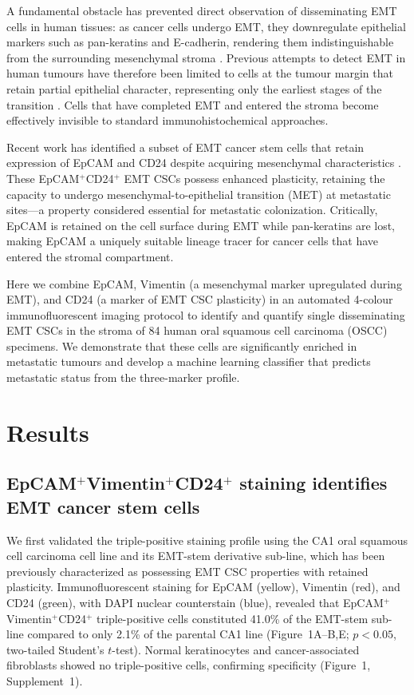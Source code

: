 \documentclass[11pt]{article}
\begin{document}
A fundamental obstacle has prevented direct observation of disseminating EMT cells in human tissues: as cancer cells undergo EMT, they downregulate epithelial markers such as pan-keratins and E-cadherin, rendering them indistinguishable from the surrounding mesenchymal stroma \citep{nieto2016emt}. Previous attempts to detect EMT in human tumours have therefore been limited to cells at the tumour margin that retain partial epithelial character, representing only the earliest stages of the transition \citep{brabletz2001variable}. Cells that have completed EMT and entered the stroma become effectively invisible to standard immunohistochemical approaches.

Recent work has identified a subset of EMT cancer stem cells that retain expression of EpCAM and CD24 despite acquiring mesenchymal characteristics \citep{bierie2017integrin,pastushenko2018identification}. These EpCAM$^{+}$CD24$^{+}$ EMT CSCs possess enhanced plasticity, retaining the capacity to undergo mesenchymal-to-epithelial transition (MET) at metastatic sites---a property considered essential for metastatic colonization. Critically, EpCAM is retained on the cell surface during EMT while pan-keratins are lost, making EpCAM a uniquely suitable lineage tracer for cancer cells that have entered the stromal compartment.

Here we combine EpCAM, Vimentin (a mesenchymal marker upregulated during EMT), and CD24 (a marker of EMT CSC plasticity) in an automated 4-colour immunofluorescent imaging protocol to identify and quantify single disseminating EMT CSCs in the stroma of 84 human oral squamous cell carcinoma (OSCC) specimens. We demonstrate that these cells are significantly enriched in metastatic tumours and develop a machine learning classifier that predicts metastatic status from the three-marker profile.

\section{Results}

\subsection{EpCAM$^{+}$Vimentin$^{+}$CD24$^{+}$ staining identifies EMT cancer stem cells}

We first validated the triple-positive staining profile using the CA1 oral squamous cell carcinoma cell line and its EMT-stem derivative sub-line, which has been previously characterized as possessing EMT CSC properties with retained plasticity. Immunofluorescent staining for EpCAM (yellow), Vimentin (red), and CD24 (green), with DAPI nuclear counterstain (blue), revealed that EpCAM$^{+}$Vimentin$^{+}$CD24$^{+}$ triple-positive cells constituted 41.0\% of the EMT-stem sub-line compared to only 2.1\% of the parental CA1 line (Figure~1A--B,E; $p < 0.05$, two-tailed Student's $t$-test). Normal keratinocytes and cancer-associated fibroblasts showed no triple-positive cells, confirming specificity (Figure~1, Supplement~1).
\end{document}
